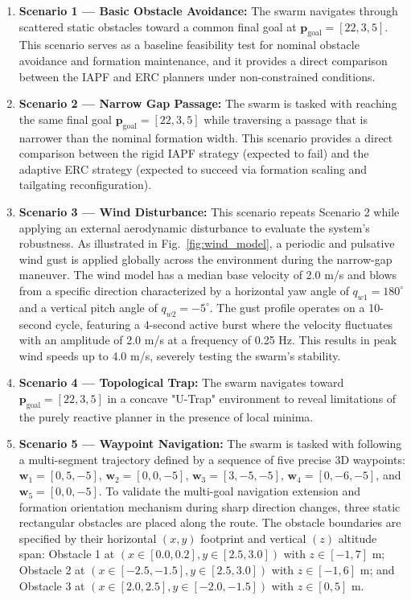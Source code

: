 \documentclass[pdflatex,sn-basic]{sn-jnl}%
\begin{document}
        \begin{enumerate}
            \item \textbf{Scenario 1 --- Basic Obstacle Avoidance:} The swarm navigates through scattered static obstacles toward a common final goal at $\boldsymbol{p}_{\text{goal}}=[22,3,5]$. This scenario serves as a baseline feasibility test for nominal obstacle avoidance and formation maintenance, and it provides a direct comparison between the IAPF and ERC planners under non-constrained conditions.
            
            \item \textbf{Scenario 2 --- Narrow Gap Passage:} The swarm is tasked with reaching the same final goal $\boldsymbol{p}_{\text{goal}}=[22,3,5]$ while traversing a passage that is narrower than the nominal formation width. This scenario provides a direct comparison between the rigid IAPF strategy (expected to fail) and the adaptive ERC strategy (expected to succeed via formation scaling and tailgating reconfiguration).

            \item \textbf{Scenario 3 --- Wind Disturbance:} This scenario repeats Scenario 2 while applying an external aerodynamic disturbance to evaluate the system's robustness. As illustrated in Fig.~\ref{fig:wind_model}, a periodic and pulsative wind gust is applied globally across the environment during the narrow-gap maneuver. The wind model has a median base velocity of 2.0 m/s and blows from a specific direction characterized by a horizontal yaw angle of $q_{w1} = 180^\circ$ and a vertical pitch angle of $q_{w2} = -5^\circ$. The gust profile operates on a 10-second cycle, featuring a 4-second active burst where the velocity fluctuates with an amplitude of 2.0 m/s at a frequency of 0.25 Hz. This results in peak wind speeds up to 4.0 m/s, severely testing the swarm's stability.
            
            \item \textbf{Scenario 4 --- Topological Trap:} The swarm navigates toward $\boldsymbol{p}_{\text{goal}}=[22,3,5]$ in a concave "U-Trap" environment to reveal limitations of the purely reactive planner in the presence of local minima.
            
            \item \textbf{Scenario 5 --- Waypoint Navigation:} The swarm is tasked with following a multi-segment trajectory defined by a sequence of five precise 3D waypoints: $\boldsymbol{w}_1=[0,5,-5]$, $\boldsymbol{w}_2=[0,0,-5]$, $\boldsymbol{w}_3=[3,-5,-5]$, $\boldsymbol{w}_4=[0,-6,-5]$, and $\boldsymbol{w}_5=[0,0,-5]$. To validate the multi-goal navigation extension and formation orientation mechanism during sharp direction changes, three static rectangular obstacles are placed along the route. The obstacle boundaries are specified by their horizontal $(x,y)$ footprint and vertical $(z)$ altitude span: Obstacle 1 at $(x\in[0.0, 0.2], y\in[2.5, 3.0])$ with $z\in[-1, 7]$ m; Obstacle 2 at $(x\in[-2.5, -1.5], y\in[2.5, 3.0])$ with $z\in[-1, 6]$ m; and Obstacle 3 at $(x\in[2.0, 2.5], y\in[-2.0, -1.5])$ with $z\in[0, 5]$ m.
            

\end{enumerate}
\end{document}
